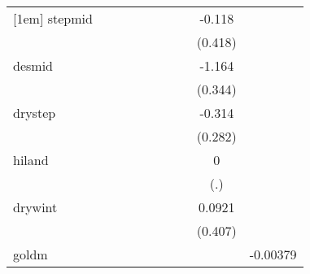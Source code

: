 {\begin{tabular}{l*{9}{c}}
[1em]
stepmid     &                     &                     &                     &                     &                     &                     &                     &      -0.118         &                     \\
            &                     &                     &                     &                     &                     &                     &                     &     (0.418)         &                     \\
[1em]
desmid      &                     &                     &                     &                     &                     &                     &                     &      -1.164\sym{***}&                     \\
            &                     &                     &                     &                     &                     &                     &                     &     (0.344)         &                     \\
[1em]
drystep     &                     &                     &                     &                     &                     &                     &                     &      -0.314         &                     \\
            &                     &                     &                     &                     &                     &                     &                     &     (0.282)         &                     \\
[1em]
hiland      &                     &                     &                     &                     &                     &                     &                     &           0         &                     \\
            &                     &                     &                     &                     &                     &                     &                     &         (.)         &                     \\
[1em]
drywint     &                     &                     &                     &                     &                     &                     &                     &      0.0921         &                     \\
            &                     &                     &                     &                     &                     &                     &                     &     (0.407)         &                     \\
[1em]
goldm       &                     &                     &                     &                     &                     &                     &                     &                     &    -0.00379         \\

\end{tabular}}
